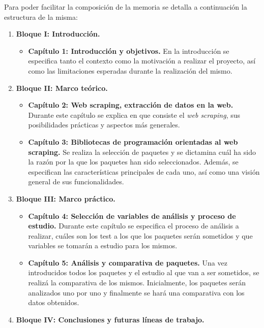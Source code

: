 Para poder facilitar la composición de la memoria se detalla a continuación la estructura de la misma:
\begin{enumerate}
  \item {\bfseries Bloque I: Introducción. }
        \begin{itemize}
          \item {\bfseries Capítulo 1: Introducción y objetivos. \justify}
                En la introducción se especifica tanto el contexto como la motivación a realizar el 
                proyecto, así como las limitaciones esperadas durante la realización del mismo.
        \end{itemize}
  \item {\bfseries Bloque II: Marco teórico. }
        \begin{itemize}
          \item {\bfseries Capítulo 2: Web scraping, extracción de datos en la web. \justify}
                Durante este capítulo se explica en que consiste el \emph{web scraping}, sus posibilidades 
                prácticas y aspectos más generales.
          \item {\bfseries Capítulo 3: Bibliotecas de programación orientadas al web scraping. \justify}
                Se realiza la selección de paquetes y se dictamina cuál ha sido la razón por la que los 
                paquetes han sido seleccionados. Además, se especifican las características principales 
                de cada uno, así como una visión general de sus funcionalidades.
        \end{itemize}
  \item {\bfseries Bloque III: Marco práctico. }
        \begin{itemize}
          \item {\bfseries Capítulo 4: Selección de variables de análisis y proceso de estudio. \justify}
                Durante este capítulo se especifica el proceso de análisis a realizar, cuáles son los test 
                a los que los paquetes serán sometidos y que variables se tomarán a estudio para los 
                mismos.
          \item {\bfseries Capítulo 5: Análisis y comparativa de paquetes. \justify}
                Una vez introducidos todos los paquetes y el estudio al que van a ser sometidos, se realizá 
                la comparativa de los mismos. Inicialmente, los paquetes serán analizados uno por uno y 
                finalmente se hará una comparativa con los datos obtenidos.
        \end{itemize}
  \item {\bfseries Bloque IV: Conclusiones y futuras líneas de trabajo. }
\end{enumerate}

